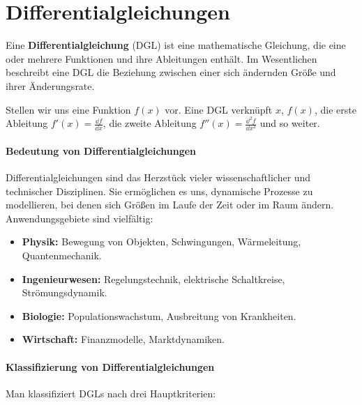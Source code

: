 \chapter{Differentialgleichungen}\label{chap: differentialgleichungen}
Eine \textbf{Differentialgleichung} (DGL) ist eine mathematische Gleichung, die eine oder mehrere Funktionen und ihre Ableitungen enthält. Im Wesentlichen beschreibt eine DGL die Beziehung zwischen einer sich ändernden Größe und ihrer Änderungsrate.

Stellen wir uns eine Funktion $f(x)$ vor. Eine DGL verknüpft $x$, $f(x)$, die erste Ableitung $f'(x) = \frac{\dd f}{\dd x}$, die zweite Ableitung $f''(x) = \frac{\dd^2 f}{\dd x^2}$ und so weiter.

\subsubsection{Bedeutung von Differentialgleichungen}
Differentialgleichungen sind das Herzstück vieler wissenschaftlicher und technischer Disziplinen. Sie ermöglichen es uns, dynamische Prozesse zu modellieren, bei denen sich Größen im Laufe der Zeit oder im Raum ändern. Anwendungsgebiete sind vielfältig:
\begin{itemize}
    \item \textbf{Physik:} Bewegung von Objekten, Schwingungen, Wärmeleitung, Quantenmechanik.
    \item \textbf{Ingenieurwesen:} Regelungstechnik, elektrische Schaltkreise, Strömungsdynamik.
    \item \textbf{Biologie:} Populationswachstum, Ausbreitung von Krankheiten.
    \item \textbf{Wirtschaft:} Finanzmodelle, Marktdynamiken.
\end{itemize}

\subsubsection{Klassifizierung von Differentialgleichungen}
Man klassifiziert DGLs nach drei Hauptkriterien:

